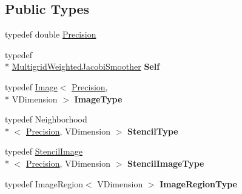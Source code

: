 \subsection*{Public Types}
\begin{DoxyCompactItemize}
\item 
typedef double \hyperlink{classitk_1_1mad_1_1_multigrid_weighted_jacobi_smoother_ad82e9067cf76f4ec4bc81b47cb1ff913}{Precision}
\item 
\hypertarget{classitk_1_1mad_1_1_multigrid_weighted_jacobi_smoother_adfd6f96242623fd305eb41b63c4b15fe}{typedef \\*
\hyperlink{classitk_1_1mad_1_1_multigrid_weighted_jacobi_smoother}{Multigrid\-Weighted\-Jacobi\-Smoother} {\bfseries Self}}\label{classitk_1_1mad_1_1_multigrid_weighted_jacobi_smoother_adfd6f96242623fd305eb41b63c4b15fe}

\item 
\hypertarget{classitk_1_1mad_1_1_multigrid_weighted_jacobi_smoother_a4cfc3c97bcdeb6cc2e1b8cb9cd9a438a}{typedef \hyperlink{class_image}{Image}$<$ \hyperlink{classitk_1_1mad_1_1_multigrid_smoother_a23c762f89a3b1509f0a64cfd42e82427}{Precision}, \\*
V\-Dimension $>$ {\bfseries Image\-Type}}\label{classitk_1_1mad_1_1_multigrid_weighted_jacobi_smoother_a4cfc3c97bcdeb6cc2e1b8cb9cd9a438a}

\item 
\hypertarget{classitk_1_1mad_1_1_multigrid_weighted_jacobi_smoother_aed24b462ee32e041e4fdfd7bff82223b}{typedef Neighborhood\\*
$<$ \hyperlink{classitk_1_1mad_1_1_multigrid_smoother_a23c762f89a3b1509f0a64cfd42e82427}{Precision}, V\-Dimension $>$ {\bfseries Stencil\-Type}}\label{classitk_1_1mad_1_1_multigrid_weighted_jacobi_smoother_aed24b462ee32e041e4fdfd7bff82223b}

\item 
\hypertarget{classitk_1_1mad_1_1_multigrid_weighted_jacobi_smoother_ad2472ea4ce3caf2dba673cfc55a2614b}{typedef \hyperlink{classitk_1_1mad_1_1_stencil_image}{Stencil\-Image}\\*
$<$ \hyperlink{classitk_1_1mad_1_1_multigrid_smoother_a23c762f89a3b1509f0a64cfd42e82427}{Precision}, V\-Dimension $>$ {\bfseries Stencil\-Image\-Type}}\label{classitk_1_1mad_1_1_multigrid_weighted_jacobi_smoother_ad2472ea4ce3caf2dba673cfc55a2614b}

\item 
\hypertarget{classitk_1_1mad_1_1_multigrid_weighted_jacobi_smoother_a13c694a23aa665eafe832a2b3428830a}{typedef Image\-Region$<$ V\-Dimension $>$ {\bfseries Image\-Region\-Type}}\label{classitk_1_1mad_1_1_multigrid_weighted_jacobi_smoother_a13c694a23aa665eafe832a2b3428830a}


\end{DoxyCompactItemize}

